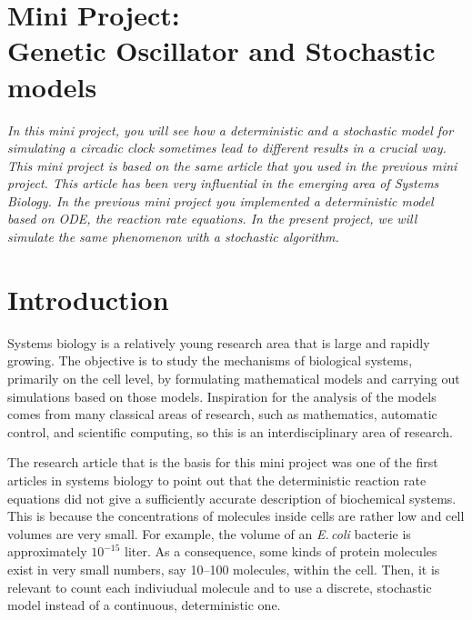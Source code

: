 \documentclass[a4paper,11pt]{article}
\newcounter{ex}
\begin{document}
\section*{Mini Project: \\Genetic Oscillator and Stochastic models}
\emph{In this mini project, you will see how a deterministic and a stochastic model for simulating a circadic clock sometimes lead to different results in a crucial way. This mini project is based on the same article that you used in the previous mini project. This article has been very influential in the emerging area of Systems Biology. In the previous mini project you implemented a deterministic model based on ODE, the reaction rate equations. In the present project, we will simulate the same phenomenon with a stochastic algorithm.}
\par\medskip\noindent

\section{Introduction}
Systems biology is a relatively young research area that is large and rapidly growing. The objective is to study the mechanisms of biological systems, primarily on the cell level, by formulating mathematical models and carrying out simulations based on those models. Inspiration for the analysis of the models comes from many classical areas of research, such as mathematics, automatic control, and scientific computing, so this is an interdisciplinary area of research.

\noindent The research article that is the basis for this mini project was one of the first articles in systems biology to point out that the deterministic reaction rate equations did not give a sufficiently accurate description of biochemical systems. This is because the concentrations of molecules inside cells are rather low and cell volumes are very small. For example, the volume of an \emph{E.\,coli} bacterie is approximately $10^{-15} $ liter. As a consequence, some kinds of protein molecules exist in very small numbers, say 10--100 molecules, within the cell. Then, it is relevant to count each indiviudual molecule and to use a discrete, stochastic model instead of a continuous, deterministic one.
\end{document}
